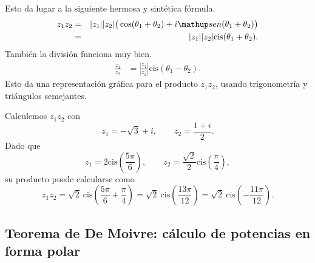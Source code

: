 Esto da lugar a la siguiente hermosa y sintética fórmula.
\begin{eqnarray*}
   z_1 z_2  &=& |z_1| |z_2| \big(\cos(\theta_1+\theta_2)+i \sen(\theta_1+\theta_2)\big)\\
    &=& |z_1| |z_2| \mbox{cis}(\theta_1+\theta_2).
\end{eqnarray*}
También la división funciona muy bien.
\begin{align*}
    \frac{z_1}{z_2} &=  \frac{|z_1|}{|z_2|} \mbox{cis}(\theta_1-\theta_2).				
\end{align*}
Esto da una representaci\'on gr\'afica para el producto $z_1z_2$, usando trigonometría y triángulos semejantes.
\begin{ejemplo}
    Calculemos $z_1 z_2$ con
    \[
        z_1 = - \sqrt{3}+i,\qquad z_2 =\frac{1+ i}{2}.
    \]
    Dado que 
    \[
        z_1 = 2 \mbox{cis}\left(\frac{5 \pi}{6}\right),\qquad
        z_2 = \frac{\sqrt{2}}{2}\mbox{cis}\left(\frac\pi 4\right),
    \]
    su producto puede calcularse como 
    $$z_1 z_2 = \sqrt{2}\ \mbox{cis}\left(\frac{5 \pi}{6}+\frac\pi 4\right)=  \sqrt{2}\ \mbox{cis}\left(\frac{13 \pi}{12}\right)= 
         \sqrt{2}\ \mbox{cis}\left(-\frac{11 \pi}{12}\right).$$
        
\begin{center}
\end{center}


\end{ejemplo}

\subsection{Teorema de De Moivre: cálculo de potencias en forma polar} 

